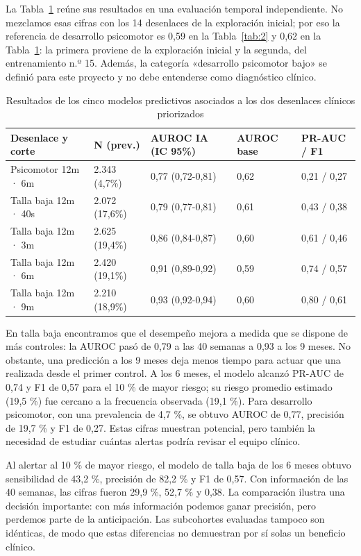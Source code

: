 La Tabla~\ref{tab:3} reúne sus resultados en una evaluación temporal independiente. No mezclamos esas cifras con los 14 desenlaces de la exploración inicial; por eso la referencia de desarrollo psicomotor es 0,59 en la Tabla~\ref{tab:2} y 0,62 en la Tabla~\ref{tab:3}: la primera proviene de la exploración inicial y la segunda, del entrenamiento n.º 15. Además, la categoría «desarrollo psicomotor bajo» se definió para este proyecto y no debe entenderse como diagnóstico clínico.

\begin{table}[t]
\centering
\caption{Resultados de los cinco modelos predictivos asociados a los dos desenlaces clínicos priorizados}
\label{tab:3}
\footnotesize
\setlength{\tabcolsep}{2pt}
\begin{tabular}{@{}p{}p{}p{}p{}p{}@{}}
\toprule
\textbf{Desenlace y corte} & \textbf{N (prev.)} & \textbf{AUROC IA (IC 95\%)} & \textbf{AUROC base} & \textbf{PR-AUC / F1} \\
\midrule
Psicomotor 12m · 6m & 2.343 (4,7\%) & 0,77 (0,72-0,81) & 0,62 & 0,21 / 0,27 \\
Talla baja 12m · 40s & 2.072 (17,6\%) & 0,79 (0,77-0,81) & 0,61 & 0,43 / 0,38 \\
Talla baja 12m · 3m & 2.625 (19,4\%) & 0,86 (0,84-0,87) & 0,60 & 0,61 / 0,46 \\
Talla baja 12m · 6m & 2.420 (19,1\%) & 0,91 (0,89-0,92) & 0,59 & 0,74 / 0,57 \\
Talla baja 12m · 9m & 2.210 (18,9\%) & 0,93 (0,92-0,94) & 0,60 & 0,80 / 0,61 \\
\bottomrule
\end{tabular}
\end{table}

En talla baja encontramos que el desempeño mejora a medida que se dispone de más controles: la AUROC pasó de 0,79 a las 40 semanas a 0,93 a los 9 meses. No obstante, una predicción a los 9 meses deja menos tiempo para actuar que una realizada desde el primer control. A los 6 meses, el modelo alcanzó PR-AUC de 0,74 y F1 de 0,57 para el 10 \% de mayor riesgo; su riesgo promedio estimado (19,5 \%) fue cercano a la frecuencia observada (19,1 \%). Para desarrollo psicomotor, con una prevalencia de 4,7 \%, se obtuvo AUROC de 0,77, precisión de 19,7 \% y F1 de 0,27. Estas cifras muestran potencial, pero también la necesidad de estudiar cuántas alertas podría revisar el equipo clínico.

Al alertar al 10 \% de mayor riesgo, el modelo de talla baja de los 6 meses obtuvo sensibilidad de 43,2 \%, precisión de 82,2 \% y F1 de 0,57. Con información de las 40 semanas, las cifras fueron 29,9 \%, 52,7 \% y 0,38. La comparación ilustra una decisión importante: con más información podemos ganar precisión, pero perdemos parte de la anticipación. Las subcohortes evaluadas tampoco son idénticas, de modo que estas diferencias no demuestran por sí solas un beneficio clínico.

